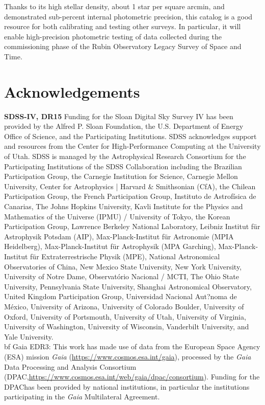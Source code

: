 \documentclass[fleqn,usenatbib]{mnras}
\begin{document}
Thanks to its high stellar density, about 1 star per square arcmin, and demonstrated sub-percent 
internal photometric precision, this catalog is a good resource for both calibrating and testing 
other surveys. In particular, it will enable high-precision photometric testing of data collected 
during the commissioning phase of the Rubin Observatory Legacy Survey of Space and Time. 

\section*{Acknowledgements}

{\bf SDSS-IV, DR15} Funding for the Sloan Digital Sky Survey IV has been provided by the Alfred P. Sloan Foundation, the U.S. Department of Energy Office of Science, and the Participating Institutions. SDSS acknowledges support and resources from the Center for High-Performance Computing at the University of Utah. SDSS is managed by the Astrophysical Research Consortium for the Participating Institutions of the SDSS Collaboration including the Brazilian Participation Group, the Carnegie Institution for Science, Carnegie Mellon University, Center for Astrophysics | Harvard \& Smithsonian (CfA), the Chilean Participation Group, the French Participation Group, Instituto de Astrof{\'i}sica de Canarias, The Johns Hopkins University, Kavli Institute for the Physics and Mathematics of the Universe (IPMU) / University of Tokyo, the Korean Participation Group, Lawrence Berkeley National Laboratory, Leibniz Institut f{\"u}r Astrophysik Potsdam (AIP), Max-Planck-Institut f{\"u}r Astronomie (MPIA Heidelberg), Max-Planck-Institut f{\"u}r Astrophysik (MPA Garching), Max-Planck-Institut f{\"u}r Extraterrestrische Physik (MPE), National Astronomical Observatories of China, New Mexico State University, New York University, University of Notre Dame, Observat{\'o}rio Nacional / MCTI, The Ohio State University, Pennsylvania State University, Shanghai Astronomical Observatory, United Kingdom Participation Group, Universidad Nacional Aut?noma de M{\'e}xico, University of Arizona, University of Colorado Boulder, University of Oxford, University of Portsmouth, University of Utah, University of Virginia, University of Washington, University of Wisconsin, Vanderbilt University, and Yale University. \\
{bf Gaia EDR3}: This work has made use of data from the European Space Agency (ESA) mission {\it Gaia} (\url{https://www.cosmos.esa.int/gaia}), processed by the {\it Gaia} Data Processing and Analysis Consortium (DPAC,\url{https://www.cosmos.esa.int/web/gaia/dpac/consortium}). Funding for the DPAChas been provided by national institutions, in particular the institutions participating in the {\it Gaia} Multilateral Agreement.\\
\end{document}
